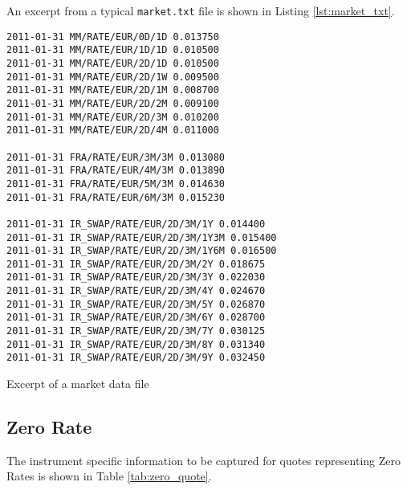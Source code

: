 An excerpt from a typical {\tt market.txt} file is shown in Listing \ref{lst:market_txt}.

\begin{listing}[H]
\begin{verbatim}
2011-01-31 MM/RATE/EUR/0D/1D 0.013750
2011-01-31 MM/RATE/EUR/1D/1D 0.010500
2011-01-31 MM/RATE/EUR/2D/1D 0.010500
2011-01-31 MM/RATE/EUR/2D/1W 0.009500
2011-01-31 MM/RATE/EUR/2D/1M 0.008700
2011-01-31 MM/RATE/EUR/2D/2M 0.009100
2011-01-31 MM/RATE/EUR/2D/3M 0.010200
2011-01-31 MM/RATE/EUR/2D/4M 0.011000

2011-01-31 FRA/RATE/EUR/3M/3M 0.013080
2011-01-31 FRA/RATE/EUR/4M/3M 0.013890
2011-01-31 FRA/RATE/EUR/5M/3M 0.014630
2011-01-31 FRA/RATE/EUR/6M/3M 0.015230

2011-01-31 IR_SWAP/RATE/EUR/2D/3M/1Y 0.014400
2011-01-31 IR_SWAP/RATE/EUR/2D/3M/1Y3M 0.015400
2011-01-31 IR_SWAP/RATE/EUR/2D/3M/1Y6M 0.016500
2011-01-31 IR_SWAP/RATE/EUR/2D/3M/2Y 0.018675
2011-01-31 IR_SWAP/RATE/EUR/2D/3M/3Y 0.022030
2011-01-31 IR_SWAP/RATE/EUR/2D/3M/4Y 0.024670
2011-01-31 IR_SWAP/RATE/EUR/2D/3M/5Y 0.026870
2011-01-31 IR_SWAP/RATE/EUR/2D/3M/6Y 0.028700
2011-01-31 IR_SWAP/RATE/EUR/2D/3M/7Y 0.030125
2011-01-31 IR_SWAP/RATE/EUR/2D/3M/8Y 0.031340
2011-01-31 IR_SWAP/RATE/EUR/2D/3M/9Y 0.032450
\end{verbatim}
\caption{Excerpt of a market data file}
\label{lst:market_txt}
\end{listing}


\subsection{Zero Rate}\label{ss:zero_rate}

The instrument specific information to be captured for quotes representing Zero Rates is shown in Table
\ref{tab:zero_quote}.

